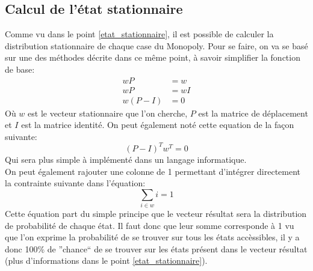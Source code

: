 \documentclass[letterpaper]{article}
\begin{document}
  \subsection{Calcul de l'état stationnaire}
    Comme vu dans le point \ref{etat_stationnaire}, il est possible de calculer
    la distribution stationnaire de chaque case du Monopoly.  Pour se faire, on va
    se basé sur une des méthodes décrite dans ce même point, à savoir simplifier la
    fonction de base:
    \begin{align*}
     wP &= w\\
     wP &= wI\\
     w(P-I) &= 0
    \end{align*}
    Où $w$ est le vecteur stationnaire que l'on cherche, $P$ est la matrice de 
    déplacement et $I$ est la matrice identité.  On peut également noté cette 
    equation de la façon suivante:
    $$(P-I)^{T} w^{T} = 0$$
    Qui sera plus simple à implémenté dans un langage informatique.\\
    On peut également rajouter une colonne de 1 permettant d'intégrer directement la 
    contrainte suivante dans l'équation:
    $$\sum\limits_{i \in w} i = 1$$
    Cette équation part du simple principe que le vecteur résultat sera la distribution 
    de probabilité de chaque état.  Il faut donc que leur somme corresponde à 1 vu 
    que l'on exprime la probabilité de se trouver sur tous les états accèssibles, il y 
    a donc 100\% de ''chance`` de se trouver sur les états présent dans le vecteur résultat 
    (plus d'informations dans le point \ref{etat_stationnaire}).
\end{document}

